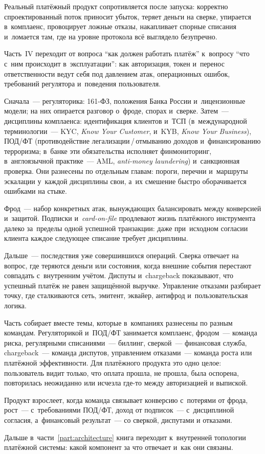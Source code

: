 %
Реальный платёжный продукт сопротивляется после запуска:
корректно спроектированный поток приносит убыток, теряет деньги
на сверке, упирается в~комплаенс, провоцирует ложные отказы,
накапливает спорные списания и~ломается там, где на уровне
протокола всё выглядело безупречно.

Часть~IV переходит от вопроса \enquote{как должен работать платёж} к~вопросу
\enquote{что с~ним происходит в~эксплуатации}: как авторизация, токен
и~перенос ответственности ведут себя под давлением атак, операционных ошибок,
требований регулятора и~поведения пользователя.

Сначала~--- регуляторика: 161-ФЗ, положения Банка России и~лицензионные модели;
на них опирается разговор о~фроде, спорах и~сверке. Затем~--- дисциплины
комплаенса: идентификация клиентов и~ТСП (в~международной терминологии~--- KYC,
\textit{Know Your Customer}, и~KYB, \textit{Know Your Business}), ПОД/ФТ
(противодействие легализации\,/\,отмыванию доходов и~финансированию
  терроризма; в~банке эти обязательства исполняет финмониторинг,
в~англоязычной практике~--- AML, \textit{anti-money laundering})
и~санкционная проверка. Они разнесены
по отдельным главам: пороги, перечни и~маршруты эскалации у~каждой дисциплины
свои, а~их смешение быстро оборачивается ошибками на стыке.

Фрод~--- набор конкретных атак, вынуждающих балансировать между конверсией
и~защитой. Подписки и~\textit{card-on-file} продлевают жизнь платёжного инструмента
далеко за~пределы одной успешной транзакции: даже при~исходном согласии
клиента каждое следующее списание требует дисциплины.

Дальше~--- последствия уже совершившихся операций. Сверка отвечает на вопрос,
где теряются деньги или состояния, когда внешние события перестают совпадать
с~внутренним учётом. Диспуты и~chargeback показывают, что успешный
платёж не равен защищённой выручке. Управление отказами разбирает точку, где
сталкиваются сеть, эмитент, эквайер, антифрод и~пользовательская логика.

Часть собирает вместе темы, которые в~компаниях разнесены по разным командам.
Регуляторикой и~ПОД/ФТ занимается комплаенс, фродом~--- команда риска,
регулярными списаниями~--- биллинг, сверкой~--- финансовая служба, chargeback~--- команда диспутов, управлением отказами~--- команда роста или
платёжной эффективности. Для платёжного продукта это одно целое:
пользователь видит только, что оплата прошла, не прошла, была оспорена,
повторилась неожиданно или исчезла где-то между авторизацией и выпиской.

Продукт взрослеет, когда команда связывает конверсию
с~потерями от фрода, рост~--- с~требованиями ПОД/ФТ, доход от подписок~---
с~дисциплиной согласия, а~финансовый результат~--- со сверкой, диспутами и
отказами.

Дальше в~части~\ref{part:architecture} книга переходит к~внутренней топологии
платёжной системы: какой компонент за что отвечает и~как они связаны.
